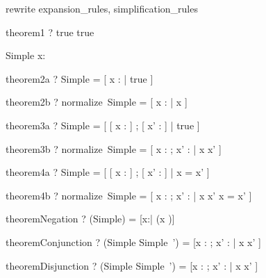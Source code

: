 \begin{zsection}
\SECTION rewrite \parents expansion\_rules, simplification\_rules
\end{zsection}

\begin{theorem}{theorem1}
  \vdash? true \iff true
\end{theorem}




\begin{schema}{Simple}
  x: \nat
\end{schema}

\begin{theorem}{theorem2a}
  \vdash? Simple = [ x : \nat | true ]
\end{theorem}

\begin{theorem}{theorem2b}
  \vdash? normalize~Simple = [ x : \arithmos | x \in \nat ]
\end{theorem}

\begin{theorem}{theorem3a}
  \vdash? \Delta Simple = [ [ x : \nat ] ; [ x' : \nat ] | true ]
\end{theorem}

\begin{theorem}{theorem3b}
  \vdash? normalize~\Delta Simple = [ x : \arithmos ; x' : \arithmos | x \in \nat \land x' \in \nat  ]
\end{theorem}

\begin{theorem}{theorem4a}
  \vdash? \Xi Simple =
	    [ [ x : \nat ] ; [ x' : \nat ] | x = x' ] 
\end{theorem}

\begin{theorem}{theorem4b}
  \vdash? normalize~\Xi Simple =
	    [ x : \arithmos ; x' : \arithmos | x \in \nat \land x' \in \nat  \land x = x' ]
\end{theorem}

\begin{theorem}{theoremNegation}
  \vdash? (\lnot Simple) = [x:\arithmos | \lnot (x \in \nat)]
\end{theorem}

\begin{theorem}{theoremConjunction}
  \vdash? (Simple \land Simple~') = [x : \arithmos; x' : \arithmos | x \in \nat \land x' \in \nat]
\end{theorem}

\begin{theorem}{theoremDisjunction}
  \vdash? (Simple \lor Simple~') = [x : \arithmos; x' : \arithmos | x \in \nat \lor x' \in \nat]
\end{theorem}

